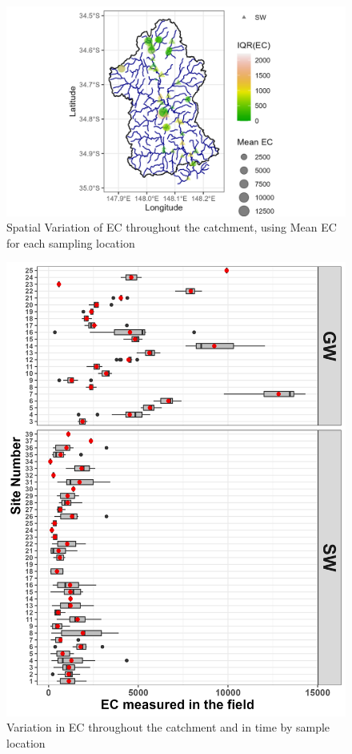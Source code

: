 \documentclass[, manuscript]{copernicus}
\begin{document}
\clearpage
\begin{figure}
\includegraphics[width=0.8\linewidth]{Figures/ec_map} \caption{Spatial Variation of EC throughout the catchment, using Mean EC for each sampling location}\label{fig:ECmap}
\end{figure}

\begin{figure}
\includegraphics[width=0.8\linewidth]{Figures/ec_plot} \caption{Variation in EC throughout the catchment and in time by sample location}\label{fig:ECboxplot}
\end{figure}
\end{document}
